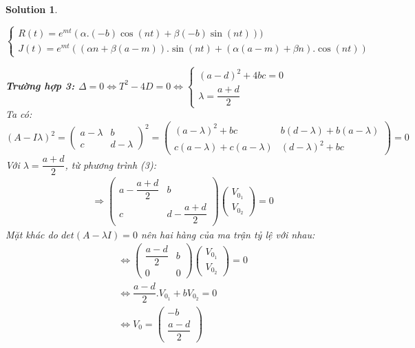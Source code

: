 \documentclass[a4paper]{article}
\newtheorem*{sol}{Solution}
\begin{document}
\begin{sol}
\begin{center}
    $\left\{\begin{matrix}
R(t)=e^{mt}(\alpha.(-b)\cos(nt)+ \beta(-b)\sin(nt)))\\
J(t)=e^{mt}((\alpha n+\beta (a-m)).\sin(nt)+(\alpha (a-m)+\beta n).\cos(nt)) 
\end{matrix}\right.$
\end{center}
\textbf{Trường hợp 3: $\Delta=0 \Leftrightarrow T ^2- 4D=0\Leftrightarrow \left\{\begin{matrix}
(a-d)^2 + 4bc=0\\ 
\lambda =\dfrac{a + d}{2}
\end{matrix}\right.$}\\
Ta có: $(A-I \lambda)^2=\begin{pmatrix}
a- \lambda &b \\ 
 c&d-\lambda 
\end{pmatrix}^{2} =\begin{pmatrix}
(a-\lambda)^2+bc &b(d-\lambda)+b(a-\lambda) \\ 
 c(a-\lambda)+c(a-\lambda)&(d-\lambda)^2+bc 
\end{pmatrix}=0$ \\
Với $\lambda= \dfrac{a + d}{2}$, từ phương trình (3): \\
\begin{align*}
    &\Rightarrow \begin{pmatrix}
    a- \dfrac{a+d}{2} &b \\ 
     c& d-\dfrac{a+d}{2} 
    \end{pmatrix}\begin{pmatrix}
    V_{0_1}\\ V_{0_2} 
    \end{pmatrix}=0
\end{align*}
Mặt khác do $det(A - \lambda I) = 0$ nên hai hàng của ma trận tỷ lệ với nhau: 
\begin{align*}
    &\Leftrightarrow \begin{pmatrix}
    \dfrac{a-d}{2} &b \\ 
     0& 0
    \end{pmatrix}\begin{pmatrix}
    V_{0_1}\\ V_{0_2} 
    \end{pmatrix}=0\\
    &\Leftrightarrow \dfrac{a-d}{2}.V_{0_1}+bV_{0_2}=0 \\
    &\Leftrightarrow V_{0}=\begin{pmatrix}
    -b\\ \dfrac{a-d}{2}

\end{pmatrix}
\end{align*}
\end{sol}
\end{document}
